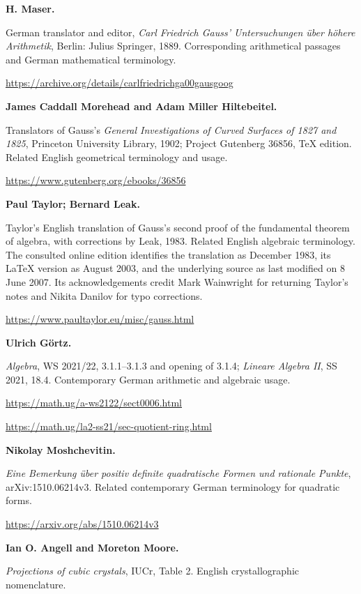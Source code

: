 \par\medskip\noindent\textbf{H. Maser.}\par\nobreak\smallskip\noindent German translator and editor, \emph{Carl Friedrich Gauss' Untersuchungen über höhere Arithmetik}, Berlin: Julius Springer, 1889. Corresponding arithmetical passages and German mathematical terminology.\par
\url{https://archive.org/details/carlfriedrichga00gausgoog}
\par\medskip\noindent\textbf{James Caddall Morehead and Adam Miller Hiltebeitel.}\par\nobreak\smallskip\noindent Translators of Gauss's \emph{General Investigations of Curved Surfaces of 1827 and 1825}, Princeton University Library, 1902; Project Gutenberg 36856, TeX edition. Related English geometrical terminology and usage.\par
\url{https://www.gutenberg.org/ebooks/36856}
\par\medskip\noindent\textbf{Paul Taylor; Bernard Leak.}\par\nobreak\smallskip\noindent Taylor's English translation of Gauss's second proof of the fundamental theorem of algebra, with corrections by Leak, 1983. Related English algebraic terminology. The consulted online edition identifies the translation as December 1983, its LaTeX version as August 2003, and the underlying source as last modified on 8 June 2007. Its acknowledgements credit Mark Wainwright for returning Taylor’s notes and Nikita Danilov for typo corrections.\par
\url{https://www.paultaylor.eu/misc/gauss.html}
\par\medskip\noindent\textbf{Ulrich Görtz.}\par\nobreak\smallskip\noindent \emph{Algebra}, WS 2021/22, 3.1.1–3.1.3 and opening of 3.1.4; \emph{Lineare Algebra II}, SS 2021, 18.4. Contemporary German arithmetic and algebraic usage.\par
\url{https://math.ug/a-ws2122/sect0006.html}\par
\url{https://math.ug/la2-ss21/sec-quotient-ring.html}
\par\medskip\noindent\textbf{Nikolay Moshchevitin.}\par\nobreak\smallskip\noindent \emph{Eine Bemerkung über positiv definite quadratische Formen und rationale Punkte}, arXiv:1510.06214v3. Related contemporary German terminology for quadratic forms.\par
\url{https://arxiv.org/abs/1510.06214v3}
\par\medskip\noindent\textbf{Ian O. Angell and Moreton Moore.}\par\nobreak\smallskip\noindent \emph{Projections of cubic crystals}, IUCr, Table 2. English crystallographic nomenclature.\par
